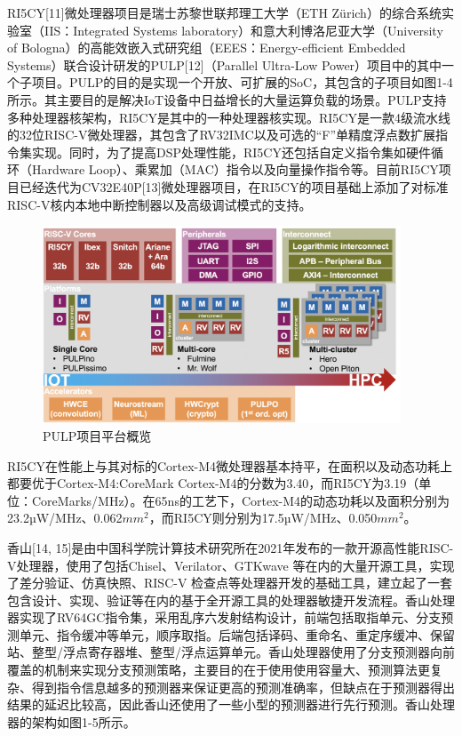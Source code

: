 RI5CY[11]微处理器项目是瑞士苏黎世联邦理工大学（ETH Zürich）的综合系统实验室（IIS：Integrated Systems laboratory）和意大利博洛尼亚大学（University of Bologna）的高能效嵌入式研究组（EEES：Energy-efficient Embedded Systems）联合设计研发的PULP[12]（Parallel Ultra-Low Power）项目中的其中一个子项目。PULP的目的是实现一个开放、可扩展的SoC，其包含的子项目如图1-4所示。其主要目的是解决IoT设备中日益增长的大量运算负载的场景。PULP支持多种处理器核架构，RI5CY是其中的一种处理器核实现。RI5CY是一款4级流水线的32位RISC-V微处理器，其包含了RV32IMC以及可选的“F”单精度浮点数扩展指令集实现。同时，为了提高DSP处理性能，RI5CY还包括自定义指令集如硬件循环（Hardware Loop）、乘累加（MAC）指令以及向量操作指令等。目前RI5CY项目已经迭代为CV32E40P[13]微处理器项目，在RI5CY的项目基础上添加了对标准RISC-V核内本地中断控制器以及高级调试模式的支持。

\begin{figure}[htbp]
	\centering
	\includegraphics[width=0.95\textwidth]{Photos/pulp_family.png}
	\caption{PULP项目平台概览}
\end{figure}

RI5CY在性能上与其对标的Cortex-M4微处理器基本持平，在面积以及动态功耗上都要优于Cortex-M4:CoreMark Cortex-M4的分数为3.40，而RI5CY为3.19（单位：CoreMarks/MHz）。在65ns的工艺下，Cortex-M4的动态功耗以及面积分别为23.2µW/MHz、0.062$mm^2$，而RI5CY则分别为17.5µW/MHz、0.050$mm^2$。

香山[14, 15]是由中国科学院计算技术研究所在2021年发布的一款开源高性能RISC-V处理器，使用了包括Chisel、Verilator、GTKwave 等在内的大量开源工具，实现了差分验证、仿真快照、RISC-V 检查点等处理器开发的基础工具，建立起了一套包含设计、实现、验证等在内的基于全开源工具的处理器敏捷开发流程。香山处理器实现了RV64GC指令集，采用乱序六发射结构设计，前端包括取指单元、分支预测单元、指令缓冲等单元，顺序取指。后端包括译码、重命名、重定序缓冲、保留站、整型/浮点寄存器堆、整型/浮点运算单元。香山处理器使用了分支预测器向前覆盖的机制来实现分支预测策略，主要目的在于使用使用容量大、预测算法更复杂、得到指令信息越多的预测器来保证更高的预测准确率，但缺点在于预测器得出结果的延迟比较高，因此香山还使用了一些小型的预测器进行先行预测。香山处理器的架构如图1-5所示。

